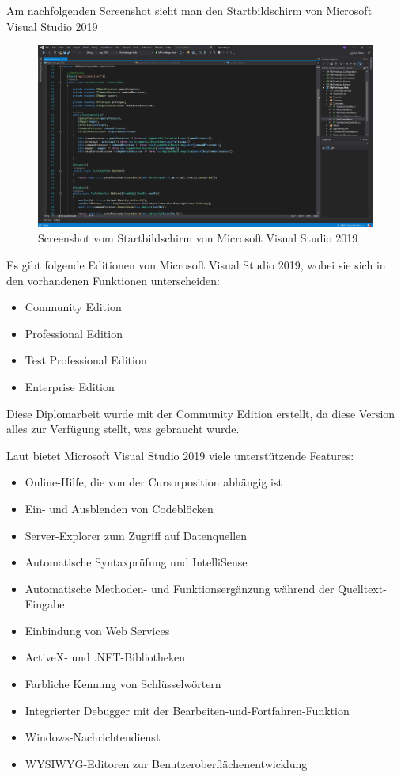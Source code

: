 Am nachfolgenden Screenshot sieht man den Startbildschirm von Microsoft Visual Studio 2019
\begin{figure}[h]
	\centerline{
		\includegraphics[width=1\textwidth, frame]{./grafiken/visual_studio_startview.png}
	}
	\vskip0pt
	\caption{Screenshot vom Startbildschirm von Microsoft Visual Studio 2019} \label{fig:visualStudioStartview}
\end{figure}

Es gibt folgende Editionen von Microsoft Visual Studio 2019, wobei sie sich in den vorhandenen Funktionen unterscheiden:
\begin{itemize}
	\item Community Edition
	\item Professional Edition
	\item Test Professional Edition
	\item Enterprise Edition
\end{itemize}

Diese Diplomarbeit wurde mit der Community Edition erstellt, da diese Version alles zur Verfügung stellt, was gebraucht wurde. \autocite{wikiVisualStudio}

Laut \autocite{wikiVisualStudio} bietet Microsoft Visual Studio 2019 viele unterstützende Features:

\begin{itemize}
	\item Online-Hilfe, die von der Cursorposition abhängig ist
	\item Ein- und Ausblenden von Codeblöcken
	\item Server-Explorer zum Zugriff auf Datenquellen
	\item Automatische Syntaxprüfung und IntelliSense
	\item Automatische Methoden- und Funktionsergänzung während der Quelltext-Eingabe
	\item Einbindung von Web Services
	\item ActiveX- und .NET-Bibliotheken
	\item Farbliche Kennung von Schlüsselwörtern
	\item Integrierter Debugger mit der Bearbeiten-und-Fortfahren-Funktion
	\item Windows-Nachrichtendienst
	\item WYSIWYG-Editoren zur Benutzeroberflächenentwicklung
\end{itemize}
